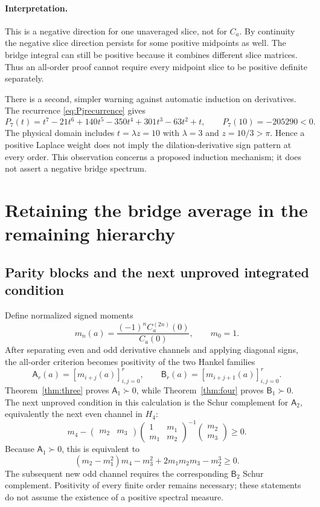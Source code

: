 \paragraph{Interpretation.}
This is a negative direction for one unaveraged slice, not for $C_a$. By continuity the negative slice direction persists for some positive midpoints as well. The bridge integral can still be positive because it combines different slice matrices. Thus an all-order proof cannot require every midpoint slice to be positive definite separately.

There is a second, simpler warning against automatic induction on derivatives. The recurrence \eqref{eq:Pjrecurrence} gives
\[
P_7(t)=t^7-21t^6+140t^5-350t^4+301t^3-63t^2+t,
\qquad P_7(10)=-205290<0.
\]
The physical domain includes $t=\lambda z=10$ with $\lambda=3$ and $z=10/3>\pi$. Hence a positive Laplace weight does not imply the dilation-derivative sign pattern at every order. This observation concerns a proposed induction mechanism; it does not assert a negative bridge spectrum.

\section{Retaining the bridge average in the remaining hierarchy}
\subsection{Parity blocks and the next unproved integrated condition}
Define normalized signed moments
\begin{equation}\label{eq:momentNotation}
m_n(a)=\frac{(-1)^n C_a^{(2n)}(0)}{C_a(0)},\qquad m_0=1.
\end{equation}
After separating even and odd derivative channels and applying diagonal signs, the all-order criterion becomes positivity of the two Hankel families
\begin{equation}\label{eq:parityHankel}
\mathsf A_r(a)=[m_{i+j}(a)]_{i,j=0}^r,
\qquad
\mathsf B_r(a)=[m_{i+j+1}(a)]_{i,j=0}^r.
\end{equation}
Theorem~\ref{thm:three} proves $\mathsf A_1\succ0$, while Theorem~\ref{thm:four} proves $\mathsf B_1\succ0$. The next unproved condition in this calculation is the Schur complement for $\mathsf A_2$, equivalently the next even channel in $H_4$:
\begin{equation}\label{eq:H4target}
\boxed{m_4-
\begin{pmatrix}m_2&m_3\end{pmatrix}
\begin{pmatrix}1&m_1\\m_1&m_2\end{pmatrix}^{-1}
\begin{pmatrix}m_2\\m_3\end{pmatrix}\ge0.}
\end{equation}
Because $\mathsf A_1\succ0$, this is equivalent to
\[
(m_2-m_1^2)m_4-m_3^2+2m_1m_2m_3-m_2^3\ge0.
\]
The subsequent new odd channel requires the corresponding $\mathsf B_2$ Schur complement. Positivity of every finite order remains necessary; these statements do not assume the existence of a positive spectral measure.

